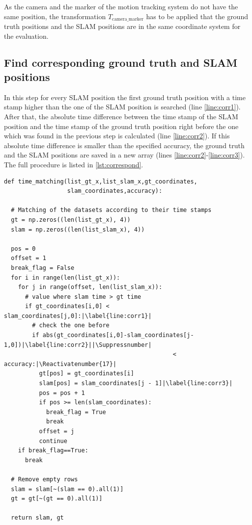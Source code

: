 As the camera and the marker of the motion tracking system do not have the same position, the transformation $T_{\text{camera\_marker}}$ has to be applied that the ground truth positions and the \ac{SLAM} positions are in the same coordinate system for the evaluation.

\subsection{Find corresponding ground truth and \ac{SLAM} positions}
In this step for every \ac{SLAM} position the first ground truth position with a time stamp higher than the one of the \ac{SLAM} position is searched (line \autoref{line:corr1}). After that, the absolute time difference between the time stamp of the \ac{SLAM} position and the time stamp of the ground truth position right before the one which was found in the previous step is calculated (line \autoref{line:corr2}). If this absolute time difference is smaller than the specified accuracy, the ground truth and the \ac{SLAM} positions are saved in a new array (lines \autoref{line:corr2}-\autoref{line:corr3}). The full procedure is listed in \autoref{lst:correspond}.

\lstset{language=Python}
\begin{lstlisting}[frame=single, caption=Find corresponding positions in time, label=lst:correspond]
def time_matching(list_gt_x,list_slam_x,gt_coordinates,
                  slam_coordinates,accuracy):

  # Matching of the datasets according to their time stamps
  gt = np.zeros((len(list_gt_x), 4))
  slam = np.zeros((len(list_slam_x), 4))

  pos = 0
  offset = 1
  break_flag = False
  for i in range(len(list_gt_x)):
    for j in range(offset, len(list_slam_x)):
      # value where slam time > gt time
      if gt_coordinates[i,0] < slam_coordinates[j,0]:|\label{line:corr1}|
        # check the one before
        if abs(gt_coordinates[i,0]-slam_coordinates[j-1,0])|\label{line:corr2}||\Suppressnumber|
                                                < accuracy:|\Reactivatenumber{17}|
          gt[pos] = gt_coordinates[i]
          slam[pos] = slam_coordinates[j - 1]|\label{line:corr3}|
          pos = pos + 1
          if pos >= len(slam_coordinates):
            break_flag = True
            break
          offset = j
          continue
    if break_flag==True:
      break

  # Remove empty rows
  slam = slam[~(slam == 0).all(1)]
  gt = gt[~(gt == 0).all(1)]

  return slam, gt
\end{lstlisting}


